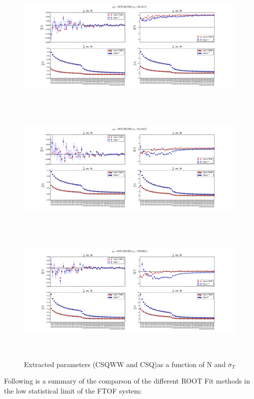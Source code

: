 \documentclass[12pt]{article}
\begin{document}
\begin{figure}[ht]
	\includegraphics[height=2.5in,width=5.5in]{fit-comp_MU-190_SG-1_fit-opt-WW_binw-1.pdf}
	\includegraphics[height=2.5in,width=5.5in]{fit-comp_MU-190_SG-3_fit-opt-WW_binw-1.pdf}
	\includegraphics[height=2.5in,width=5.5in]{fit-comp_MU-190_SG-5_fit-opt-WW_binw-1.pdf}
	\caption{Extracted parameters (CSQWW and CSQ)as a function of N and $\sigma_{T}$}
	\label{fig3}
\end{figure}

\clearpage

Following is a summary of the comparson of the different ROOT Fit methods in the low statistical limit of the FTOF system:
\end{document}
